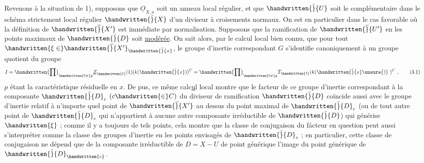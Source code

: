  Revenons à la situation de 1), supposons que $\underline{O}_{X,x}$ soit un anneau local régulier, et que $\handwritten{\bar}{U}$ soit le complémentaire dans le schéma strictement local régulier $\handwritten{\bar}{X}$ d'un diviseur  à croisements normaux. On est en particulier dans le cas favorable où la définition de $\handwritten{\overline}{X'}$ est immédiate par normalisation. Supposons que la ramification de $\handwritten{\overline}{U'}$ en les points maximaux de $\handwritten{\bar}{D}$ soit \uline{modérée}. On sait alors, par le calcul local bien connu, que pour tout $\handwritten{\xi\in}\handwritten{\overline}{X'}_{\handwritten{\bar}{x}}$, le groupe d'inertie correspondant $G$ s'identifie canoniquement  à un groupe quotient du groupe
\[
I=\handwritten{\prod}_{\handwritten{\ell\ne}p}\underline{Z}_{\handwritten{\ell}}(1)(k(\handwritten{\bar}{x}))^C=\handwritten{\prod}_{\handwritten{\ell\ne}p}T_{\handwritten{\ell}}(k(\handwritten{\bar}{x}\unsure{)}\ )^C\ ,
\tag*{(3.1)}
\]
$p$ étant la caractéristique résiduelle en $x$. De pus, ce même calc\uline{u}l local montre que le facteur de ce groupe d'inertie correspondant à la composante $\handwritten{\bar}{D}_c$ $(c\handwritten{\in}C)$ du diviseur de ramification $\handwritten{\bar}{D}$ coïncide aussi avec le groupe d'inertie relatif à n'importe quel point de $\handwritten{\overline}{X'}$ au dessus du point maximal de $\handwritten{\bar}{D}_c$ (ou de tout autre point de $\handwritten{\bar}{D}_c$ qui n'appartient à aucune autre composante irréductible de $\handwritten{\bar}{D}$) qui générise $\handwritten{\xi}$ ; comme il y a toujours de tels points, cela montre que la classe de conjugaison du fácteur en question peut aussi s'interpréter comme la  classe des groupes d'inertie en les points envisagés de $\handwritten{\bar}{D}_c$ ; en particulier, cette classe de conjugaison ne dépend que de la composante irréductible de $D=X-U$  de point générique l'image du point générique de $\handwritten{\bar}{D}_{\handwritten{c}}$.


